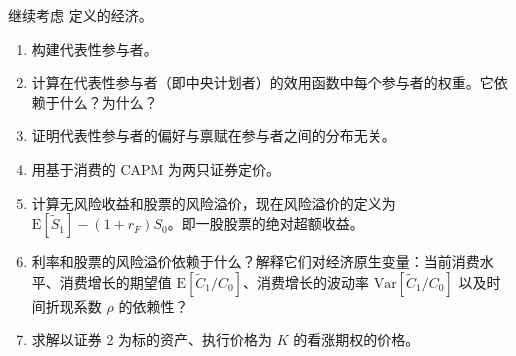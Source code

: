 \par\noindent\begin{minipage}{\linewidth}
\begin{problem}
 继续考虑 定义的经济。
\begin{enumerate}[label=(\alph*)]
    \item 构建代表性参与者。
    \item 计算在代表性参与者（即中央计划者）的效用函数中每个参与者的权重。它依赖于什么？为什么？
    \item 证明代表性参与者的偏好与禀赋在参与者之间的分布无关。
    \item 用基于消费的 CAPM 为两只证券定价。
    \item 计算无风险收益和股票的风险溢价，现在风险溢价的定义为 $\mathrm{E}[\tilde{S}_{1}]-(1+r_{F})S_{0}$。即一股股票的绝对超额收益。
    \item 利率和股票的风险溢价依赖于什么？解释它们对经济原生变量：当前消费水平、消费增长的期望值 $\mathrm{E}[\tilde{C}_{1}/C_{0}]$、消费增长的波动率 $\mathrm{Var}[\tilde{C}_{1}/C_{0}]$ 以及时间折现系数 $\rho$ 的依赖性？
    \item 求解以证券 2 为标的资产、执行价格为 $K$ 的看涨期权的价格。
\end{enumerate}
\end{problem}
\end{minipage}\par
{}
